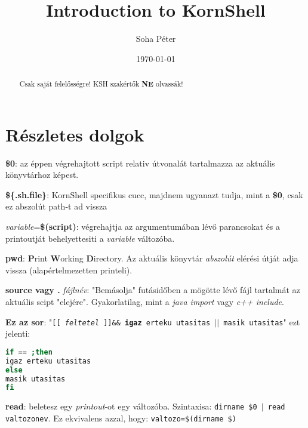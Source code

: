\documentclass{article}
\begin{document}
\title{Introduction to KornShell}
\author{Soha Péter}
\date{\today}

\maketitle

\begin{abstract}
Csak saját felelősségre! KSH szakértők \textbf{NE} olvassák!
\end{abstract}

\section{Részletes dolgok}
\textbf{\$0}: az éppen végrehajtott script relativ útvonalát tartalmazza az aktuális könyvtárhoz képest.\newline

\textbf{\$\{.sh.file\}}: KornShell specifikus cucc,  majdnem ugyanazt tudja, mint a \textbf{\$0}, csak ez abszolút path-t ad vissza\newline

\textit{variable}=\textbf{\$(script)}: végrehajtja az argumentumában lévő parancsokat és a printoutját behelyettesiti a \textit{variable} változóba.\newline

\textbf{pwd}: \textbf{P}rint \textbf{W}orking \textbf{D}irectory. Az aktuális könyvtár \textit{abszolút} elérési útját adja vissza (alapértelmezetten printeli).\newline

\textbf{source vagy .} \textit{fájlnév}: "Bemásolja" futásidőben a mögötte lévő fájl tartalmát az aktuális scipt "elejére". Gyakorlatilag, mint a \textit{java import} vagy \textit{c++ include}.\newline 

\textbf{Ez az sor}: 
"\texttt{[[ \textit{feltetel} ]]\&\& \textbf{igaz} erteku utasitas $||$ masik utasitas}" ezt jelenti: 
\begin{lstlisting}[language=bash]
if == ;then
igaz erteku utasitas 
else
masik utasitas
fi
\end{lstlisting}

\textbf{read}: beletesz egy \textit{printout}-ot egy változóba. Szintaxisa: \texttt{dirname \$0 $|$ read valtozonev}. Ez ekvivalens azzal, hogy: \texttt{valtozo=\$(dirname \$)}\newline




\newpage
\end{document}
